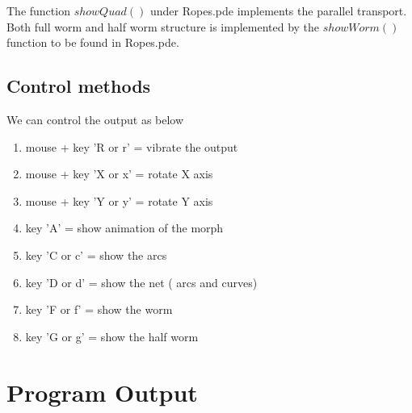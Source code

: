 \documentclass[twoside,11pt]{article}
\begin{document}
The function $showQuad()$ under Ropes.pde implements the parallel transport. Both full worm and half worm structure is implemented by the $showWorm()$ function to be found in Ropes.pde.

\subsection{Control methods}
We can control the output as below \begin{enumerate}
 \item mouse + key 'R or r' = vibrate the output
 \item mouse + key 'X or x' = rotate X axis
 \item mouse + key 'Y or y' = rotate Y axis
\item key 'A' = show animation of the morph
\item key 'C or c' = show the arcs
\item key 'D or d' = show the net ( arcs and curves)
\item key 'F or f' = show the worm
\item key 'G or g' = show the half worm

 \end{enumerate}
 
 
 
\section{Program Output}
\end{document}
